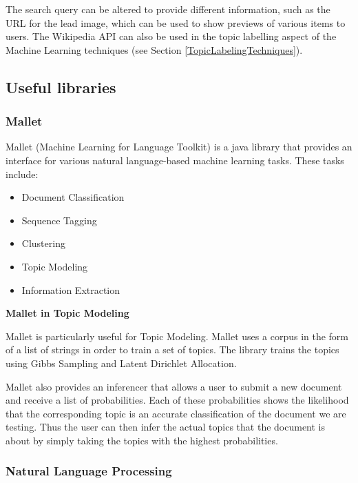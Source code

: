 \documentclass[12pt]{article}
\begin{document}
The search query can be altered to provide different information, such as the URL for the lead image, which can be used to show previews of various items to users. The Wikipedia API can also be used in the topic labelling aspect of the Machine Learning techniques (see Section \ref{TopicLabelingTechniques}).

\subsection{Useful libraries}

\label{libraries}

\subsubsection{Mallet}

\label{mallet}

Mallet (Machine Learning for Language Toolkit) is a java library that provides an interface for various natural language-based machine learning tasks. These tasks include:

\begin{itemize}
	\item Document Classification
	\item Sequence Tagging
	\item Clustering
	\item Topic Modeling
	\item Information Extraction \\
\end{itemize}

\textbf{Mallet in Topic Modeling}

Mallet is particularly useful for Topic Modeling. Mallet uses a corpus in the form of a list of strings in order to train a set of topics. The library trains the topics using Gibbs Sampling and Latent Dirichlet Allocation.

Mallet also provides an inferencer that allows a user to submit a new document and receive a list of probabilities. Each of these probabilities shows the likelihood that the corresponding topic is an accurate classification of the document we are testing. Thus the user can then infer the actual topics that the document is about by simply taking the topics with the highest probabilities. 
 

\subsubsection{Natural Language Processing}
\end{document}
